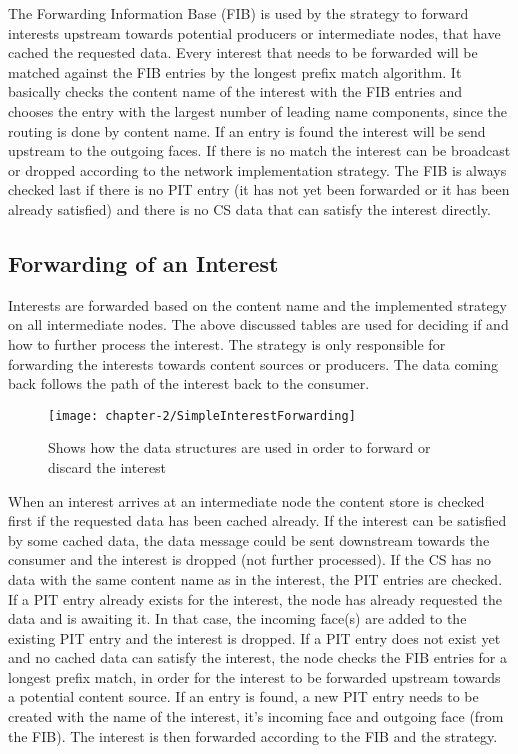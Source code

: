 The Forwarding Information Base (FIB) is used by the strategy to forward interests upstream towards potential producers or intermediate nodes, that have cached the requested data. Every interest that needs to be forwarded will be matched against the FIB entries by the longest prefix match algorithm. It basically checks the content name of the interest with the FIB entries and chooses the entry with the largest number of leading name components, since the routing is done by content name. If an entry is found the interest will be send upstream to the outgoing faces. If there is no match the interest can be broadcast or dropped according to the network implementation strategy. The FIB is always checked last if there is no PIT entry (it has not yet been forwarded or it has been already satisfied) and there is no CS data that can satisfy the interest directly.

\subsection{Forwarding of an Interest}

Interests are forwarded based on the content name and the implemented strategy on all intermediate nodes. The above discussed tables are used for deciding if and how to further process the interest. The strategy is only responsible for forwarding the interests towards content sources or producers. The data coming back follows the path of the interest back to the consumer.

\begin{figure}[H]
  \centering
  \texttt{[image: chapter-2/SimpleInterestForwarding]}
  \caption{Shows how the data structures are used in order to forward or discard the interest}
  \label{fig:SimpleInterestForwarding}
\end{figure}

When an interest arrives at an intermediate node the content store is checked first if the requested data has been cached already. If the interest can be satisfied by some cached data, the data message could be sent downstream towards the consumer and the interest is dropped (not further processed). If the CS has no data with the same content name as in the interest, the PIT entries are checked. If a PIT entry already exists for the interest, the node has already requested the data and is awaiting it. In that case, the incoming face(s) are added to the existing PIT entry and the interest is dropped. If a PIT entry does not exist yet and no cached data can satisfy the interest, the node checks the FIB entries for a longest prefix match, in order for the interest to be forwarded upstream towards a potential content source. If an entry is found, a new PIT entry needs to be created with the name of the interest, it's incoming face and outgoing face (from the FIB). The interest is then forwarded according to the FIB and the strategy.

